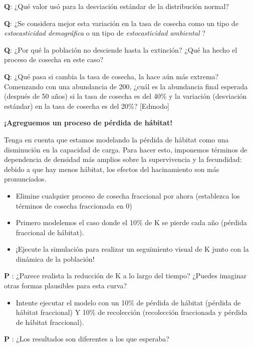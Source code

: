 \documentclass[
]{article}
\providecommand{\tightlist}{%
  \setlength{\itemsep}{0pt}\setlength{\parskip}{0pt}}
\begin{document}
\textbf{Q}: ¿Qué valor usó para la desviación estándar de la
distribución normal?

\textbf{Q}: ¿Se considera mejor esta variación en la tasa de cosecha
como un tipo de \emph{estocasticidad demográfica } o un tipo de
\emph{estocasticidad ambiental }?

\textbf{Q}: ¿Por qué la población no desciende hasta la extinción? ¿Qué
ha hecho el proceso de cosecha en este caso?

\textbf{Q}: ¿Qué pasa si cambia la tasa de cosecha, la hace aún más
extrema? Comenzando con una abundancia de 200, ¿cuál es la abundancia
final esperada (después de 50 años) si la tasa de cosecha es del 40\% y
la variación (desviación estándar) en la tasa de cosecha es del 20\%?
{[}Edmodo{]}

\textbf{¡Agreguemos un proceso de pérdida de hábitat!}

Tenga en cuenta que estamos modelando la pérdida de hábitat como una
disminución en la capacidad de carga. Para hacer esto, imponemos
términos de dependencia de densidad más amplios sobre la supervivencia y
la fecundidad: debido a que hay menos hábitat, los efectos del
hacinamiento son más pronunciados.

\begin{itemize}
\item
  Elimine cualquier proceso de cosecha fraccional por ahora (establezca
  los términos de cosecha fraccionada en 0)
\item
  Primero modelemos el caso donde el 10\% de K se pierde cada año
  (pérdida fraccional de hábitat).
\item
  ¡Ejecute la simulación para realizar un seguimiento visual de K junto
  con la dinámica de la población!
\end{itemize}

\textbf{P }: ¿Parece realista la reducción de K a lo largo del tiempo?
¿Puedes imaginar otras formas plausibles para esta curva?

\begin{itemize}
\tightlist
\item
  Intente ejecutar el modelo con un 10\% de pérdida de hábitat (pérdida
  de hábitat fraccional) Y 10\% de recolección (recolección fraccionada
  y pérdida de hábitat fraccional).
\end{itemize}

\textbf{P }: ¿Los resultados son diferentes a los que esperaba?
\end{document}
